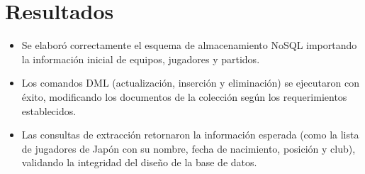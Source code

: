 \chapter{Resultados}

\begin{itemize}
    \item Se elaboró correctamente el esquema de almacenamiento NoSQL importando la información inicial de equipos, jugadores y partidos.
    \item Los comandos DML (actualización, inserción y eliminación) se ejecutaron con éxito, modificando los documentos de la colección según los requerimientos establecidos.   
    \item Las consultas de extracción retornaron la información esperada (como la lista de jugadores de Japón con su nombre, fecha de nacimiento, posición y club), validando la integridad del diseño de la base de datos. 
\end{itemize}